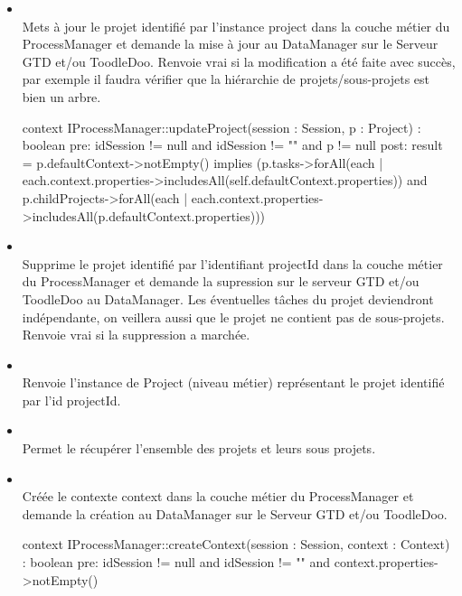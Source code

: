\begin{itemize}
		\item {} \\
		Mets à jour le projet identifié par l'instance project dans la couche métier
		du ProcessManager et demande la mise à jour au DataManager sur le Serveur GTD
		et/ou ToodleDoo.
		Renvoie vrai si la modification a été faite avec succès, par exemple il faudra vérifier que la hiérarchie de projets/sous-projets est bien un arbre.
\begin{ocl}
context IProcessManager::updateProject(session : Session, p : Project) : boolean
pre: 
	idSession != null and idSession != "" and
	p != null
post:
	result = p.defaultContext->notEmpty() implies
		(p.tasks->forAll(each | each.context.properties->includesAll(self.defaultContext.properties)) and
		p.childProjects->forAll(each | each.context.properties->includesAll(p.defaultContext.properties)))
\end{ocl}
		
		\item {} \\
		Supprime le projet identifié par l'identifiant projectId dans la couche métier
		du ProcessManager et demande la supression sur le serveur GTD et/ou ToodleDoo
		au DataManager.
Les éventuelles tâches du projet deviendront indépendante, on veillera aussi que le projet ne contient pas de sous-projets. Renvoie vrai si la suppression a marchée.
		
		\item {} \\
		Renvoie l'instance de Project (niveau métier) représentant le projet
		identifié par l'id projectId.
		
		\item {} \\
		Permet le récupérer l'ensemble des projets et leurs sous projets.
		

		\item {} \\
		Créée le contexte context dans la couche métier du ProcessManager et demande
		la création au DataManager sur le Serveur GTD et/ou ToodleDoo.
\begin{ocl}
context IProcessManager::createContext(session : Session, context : Context) : boolean
pre: 
	idSession != null and idSession != "" and
	context.properties->notEmpty()
\end{ocl}


\end{itemize}

